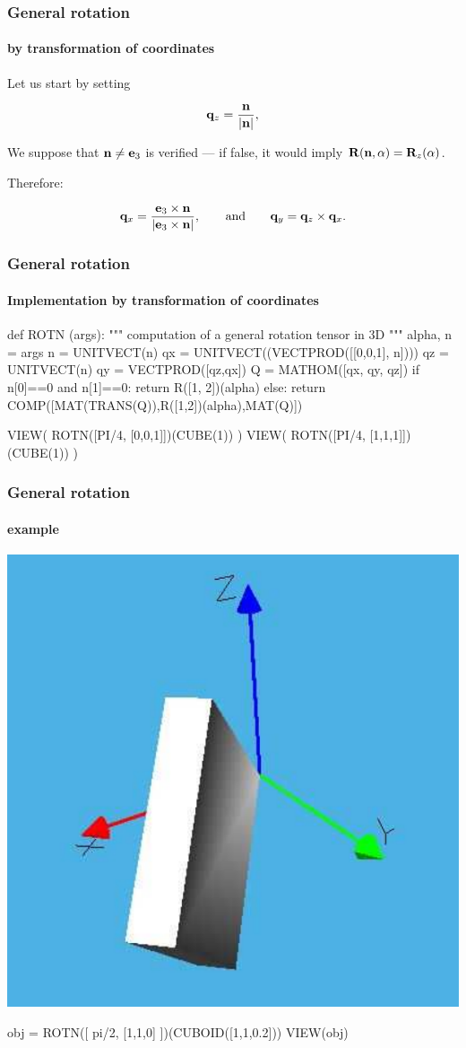 \documentclass{beamer}
\begin{document}
\begin{frame}
\frametitle{General rotation}
\framesubtitle{by transformation of coordinates}\small

Let us start by setting

\[
{\bf q}_z = {{\bf n}\over |{\bf n}|},
\]

\vfill

We suppose that  ${\bf n}\not={\bf e}_3$ is verified --- if false, it would imply ${\bf R}({\bf n}, \alpha) =
{\bf R}_z(\alpha)$. 

\vfill

Therefore:

\vfill

\[
{\bf q}_x = {{{\bf e}_3 \times {\bf n}}\over |{{\bf e}_3 \times {\bf n}}|},
\qquad\mbox{and}\qquad
{\bf q}_y = {{\bf q}_z\times {\bf q}_x}.
\]

\end{frame}
\begin{frame}[fragile]
\frametitle{General rotation}
\framesubtitle{Implementation by transformation of coordinates}\small



\vfill

\begin{python}
def ROTN (args):
	""" computation of a general rotation tensor in 3D """
    alpha, n = args
    n  = UNITVECT(n)
    qx = UNITVECT((VECTPROD([[0,0,1], n])))
    qz = UNITVECT(n)
    qy = VECTPROD([qz,qx])
    Q  = MATHOM([qx, qy, qz])
    if n[0]==0 and n[1]==0:
        return R([1, 2])(alpha)
    else:
        return COMP([MAT(TRANS(Q)),R([1,2])(alpha),MAT(Q)])

VIEW( ROTN([PI/4, [0,0,1]])(CUBE(1)) )
VIEW( ROTN([PI/4, [1,1,1]])(CUBE(1)) )
\end{python}


\end{frame}
\begin{frame}[fragile]
\frametitle{General rotation}
\framesubtitle{example}\small

\centering\includegraphics[width=0.4\linewidth]{figs/mkframe}

\vfill

\begin{python}
obj = ROTN([ pi/2, [1,1,0] ])(CUBOID([1,1,0.2]))
VIEW(obj)
\end{python}

\end{frame}
\end{document}
